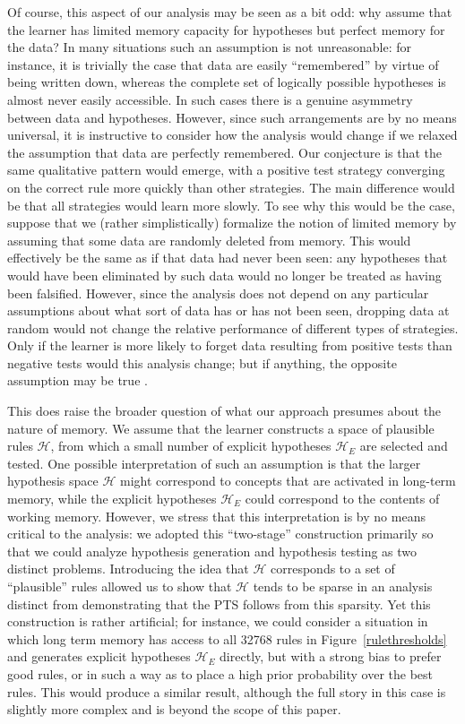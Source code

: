 \documentclass{apa}
\newcommand{\ruleset}{\mathcal{H}}
\begin{document}
Of course, this aspect of our analysis may be seen as a bit odd: why assume that the learner has limited memory capacity for hypotheses but perfect memory for the data? In many situations such an assumption is not unreasonable: for instance, it is trivially the case that data are easily ``remembered'' by virtue of being written down, whereas the complete set of logically possible hypotheses is almost never easily accessible.  In such cases there is a genuine asymmetry between data and hypotheses.  However, since such arrangements are by no means universal, it is instructive to consider how the analysis would change if we relaxed the assumption that data are perfectly remembered. Our conjecture is that the same qualitative pattern would emerge, with a positive test strategy converging on the correct rule more quickly than other strategies. The main difference would be that all strategies would learn more slowly. To see why this would be the case, suppose that we (rather simplistically) formalize the notion of limited memory by assuming that some data are randomly deleted from memory. This would effectively be the same as if that data had never been seen: any hypotheses that would have been eliminated by such data would no longer be treated as having been falsified.  However, since the analysis does not depend on any particular assumptions about what sort of data has or has not been seen, dropping data at random would not change the relative performance of different types of strategies. Only if the learner is more likely to forget data resulting from positive tests than negative tests would this analysis change; but if anything, the opposite assumption may be true \cite{taplin75}.

This does raise the broader question of what our approach presumes about the nature of memory. We assume that the learner constructs a space of plausible rules $\ruleset$, from which a small number of explicit hypotheses $\ruleset_E$ are selected and tested. One possible interpretation of such an assumption is that the larger hypothesis space $\ruleset$ might correspond to concepts that are activated in long-term memory, while the explicit hypotheses $\ruleset_E$ could correspond to the contents of working memory.  However, we stress that this interpretation is by no means critical to the analysis: we adopted this ``two-stage'' construction primarily so that we could analyze hypothesis generation and hypothesis testing as two distinct problems. Introducing the idea that $\ruleset$ corresponds to a set of ``plausible'' rules allowed us to show that $\ruleset$ tends to be sparse in an analysis distinct from demonstrating that the PTS follows from this sparsity. Yet this construction is rather artificial; for instance, we could consider a situation in which long term memory has access to all 32768 rules in Figure~\ref{rulethresholds} and generates explicit hypotheses $\ruleset_E$ directly, but with a strong bias to prefer good rules, or in such a way as to place a high prior probability over the best rules. This would produce a similar result, although the full story in this case is slightly more complex and is beyond the scope of this paper.
\end{document}
